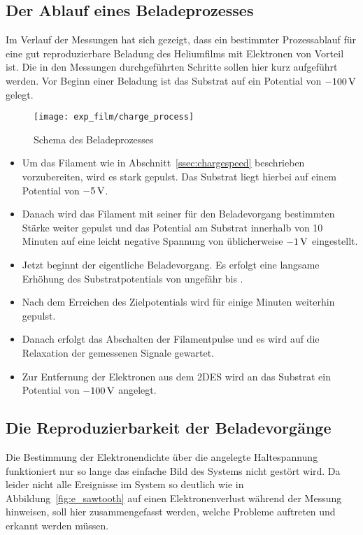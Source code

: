 \subsection{Der Ablauf eines Beladeprozesses}
\label{ssec:process}
Im Verlauf der Messungen hat sich gezeigt, dass ein bestimmter Prozessablauf für eine gut reproduzierbare Beladung des Heliumfilms mit Elektronen von Vorteil ist. Die in den Messungen durchgeführten Schritte sollen hier kurz aufgeführt werden. Vor Beginn einer Beladung ist das Substrat auf ein Potential von $\unit[-100]{V}$ gelegt.
\begin{figure}[h!tb]
    \hfill\texttt{[image: exp\_film/charge\_process]}%
    \hfill%
    \begin{minipage}[b]{\textwidth-\smidwidth-\tabcolsep}
        \caption[Schema des Beladeprozesses]{Schema des Beladeprozesses}
        \label{fig:charge_process}
    \end{minipage}
\end{figure}
\begin{itemize}
	\item Um das Filament wie in Abschnitt~\ref{ssec:chargespeed} beschrieben vorzubereiten, wird es stark gepulst. Das Substrat liegt hierbei auf einem Potential von $\unit[-5]{V}$.
	\item Danach wird das Filament mit seiner für den Beladevorgang bestimmten Stärke weiter gepulst und das Potential am Substrat innerhalb von 10 Minuten auf eine leicht negative Spannung von üblicherweise $\unit[-1]{V}$ eingestellt.
	\item Jetzt beginnt der eigentliche Beladevorgang. Es erfolgt eine langsame Erhöhung des Substratpotentials von ungefähr  bis .
	\item Nach dem Erreichen des Zielpotentials wird für einige Minuten weiterhin gepulst.
	\item Danach erfolgt das Abschalten der Filamentpulse und es wird auf die Relaxation der gemessenen Signale gewartet.
	\item Zur Entfernung der Elektronen aus dem 2DES wird an das Substrat ein Potential von $\unit[-100]{V}$ angelegt.
\end{itemize}


\subsection{Die Reproduzierbarkeit der Beladevorgänge}
\enlargethispage{\baselineskip}

\label{ssec:pmma_reproduce}
Die Bestimmung der Elektronendichte über die angelegte Haltespannung funktioniert nur so lange das einfache Bild des Systems nicht gestört wird. Da leider nicht alle Ereignisse im System so deutlich wie in Abbildung~\ref{fig:e_sawtooth} auf einen Elektronenverlust während der Messung hinweisen, soll hier zusammengefasst werden, welche Probleme auftreten und erkannt werden müssen.


